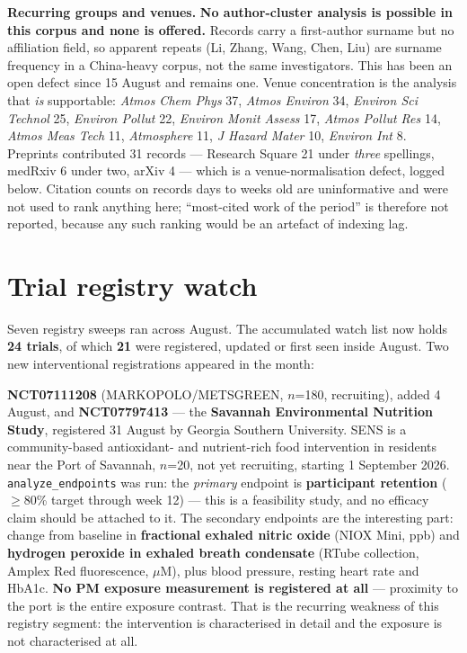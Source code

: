 \documentclass[10pt]{article}
\begin{document}
\vspace{2mm}
\textbf{Recurring groups and venues.} \textbf{No author-cluster analysis is possible in
this corpus and none is offered.} Records carry a first-author surname but no
affiliation field, so apparent repeats (Li, Zhang, Wang, Chen, Liu) are surname frequency
in a China-heavy corpus, not the same investigators. This has been an open defect since
15 August and remains one. Venue concentration is the analysis that \emph{is} supportable:
\textit{Atmos Chem Phys} 37, \textit{Atmos Environ} 34, \textit{Environ Sci Technol} 25,
\textit{Environ Pollut} 22, \textit{Environ Monit Assess} 17, \textit{Atmos Pollut Res}
14, \textit{Atmos Meas Tech} 11, \textit{Atmosphere} 11, \textit{J Hazard Mater} 10,
\textit{Environ Int} 8. Preprints contributed 31 records --- Research Square 21 under
\emph{three} spellings, medRxiv 6 under two, arXiv 4 --- which is a venue-normalisation
defect, logged below. Citation counts on records days to weeks old are uninformative and were not used
to rank anything here; ``most-cited work of the period'' is therefore not reported,
because any such ranking would be an artefact of indexing lag.

\clearpage

\section*{\sffamily\bfseries\color{Deep}Trial registry watch}
\vspace{-1.5mm}{\color{Coral}\rule{\linewidth}{1.1pt}}\vspace{2.5mm}

\footnotesize
Seven registry sweeps ran across August. The accumulated watch list now holds
\textbf{24 trials}, of which \textbf{21} were registered, updated or first seen inside
August. Two new interventional registrations appeared in the month:

\vspace{1.5mm}
\textbf{NCT07111208} (MARKOPOLO/METSGREEN, $n$=180, recruiting), added 4 August, and
\textbf{NCT07797413} --- the \textbf{Savannah Environmental Nutrition Study}, registered
31 August by Georgia Southern University. SENS is a community-based
antioxidant- and nutrient-rich food intervention in residents near the Port of Savannah,
$n$=20, not yet recruiting, starting 1 September 2026. \texttt{analyze\_endpoints} was
run: the \emph{primary} endpoint is \textbf{participant retention} ($\geq$80\% target
through week 12) --- this is a feasibility study, and no efficacy claim should be
attached to it. The secondary endpoints are the interesting part: change from baseline in
\textbf{fractional exhaled nitric oxide} (NIOX Mini, ppb) and \textbf{hydrogen peroxide in
exhaled breath condensate} (RTube collection, Amplex Red fluorescence, $\mu$M), plus
blood pressure, resting heart rate and HbA1c. \textbf{No PM exposure measurement is
registered at all} --- proximity to the port is the entire exposure contrast. That is the
recurring weakness of this registry segment: the intervention is characterised in detail
and the exposure is not characterised at all.
\end{document}
